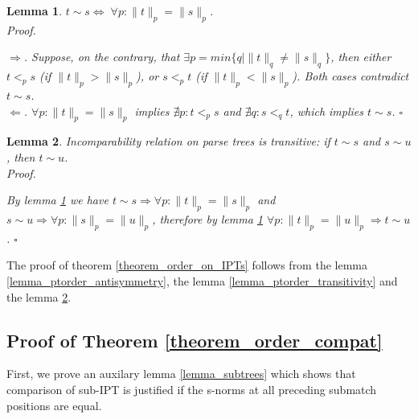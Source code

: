 \documentclass[AMA,STIX1COL]{WileyNJD-v2}
\newtheorem{XLem}{Lemma}
\begin{document}
    \begin{XLem}\label{incomparability_equivdef}
    $t \sim s \Leftrightarrow \; \forall p : \|t\|_p = \|s\|_p$.
    \\
    Proof.

    $\Rightarrow$. %
    Suppose, on the contrary, that $\exists p = min \{ q \mid \|t\|_q \neq \|s\|_q \}$,
    then either $t <_p s$ (if $\|t\|_p > \|s\|_p$), or $s <_p t$ (if $\|t\|_p < \|s\|_p$).
    Both cases contradict $t \sim s$.
    \\[-1em]

    $\Leftarrow$.
    $\forall p : \|t\|_p = \|s\|_p$ implies
    $\nexists p : t <_p s$ and $\nexists q : s <_q t$,
    which implies $t \sim s$.
    $\square$
    \end{XLem}

    \begin{XLem}\label{lemma_ptorder_transitivity_of_incomparability}
    Incomparability relation on parse trees is transitive: if $t \sim s$ and $s \sim u$, then $t \sim u$.
    \\
    Proof.

    By lemma \ref{incomparability_equivdef} we have
    $t \sim s \Rightarrow \forall p : \|t\|_p = \|s\|_p$ and
    $s \sim u \Rightarrow \forall p : \|s\|_p = \|u\|_p$,
    therefore by lemma \ref{incomparability_equivdef} $\forall p : \|t\|_p = \|u\|_p \Rightarrow t \sim u$.
    $\square$
    \end{XLem}

The proof of theorem \ref{theorem_order_on_IPTs}
follows from
the lemma \ref{lemma_ptorder_antisymmetry},
the lemma \ref{lemma_ptorder_transitivity} and
the lemma \ref{lemma_ptorder_transitivity_of_incomparability}.


\subsection*{Proof of Theorem \ref{theorem_order_compat}}

First, we prove an auxilary lemma \ref{lemma_subtrees} which
shows that comparison of sub-IPT is justified
if the s-norms at all preceding submatch positions are equal.
\end{document}
